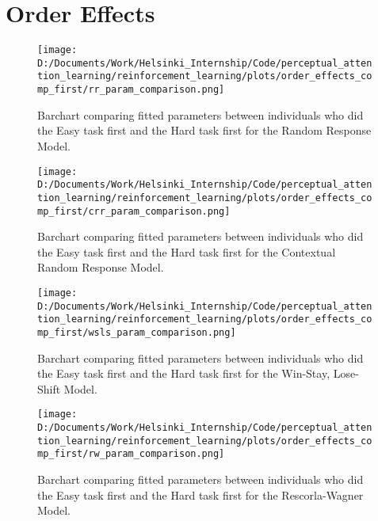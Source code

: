 \documentclass[12pt]{article}
\newcommand{\scale}{0.4}
\begin{document}
\section{Order Effects}

\begin{figure}[h]  %
	\centering
	\texttt{[image: D:/Documents/Work/Helsinki\_Internship/Code/perceptual\_attention\_learning/reinforcement\_learning/plots/order\_effects\_comp\_first/rr\_param\_comparison.png]}  %
	\caption{Barchart comparing fitted parameters between individuals who did the Easy task first and the Hard task first for the Random Response Model.}
	\label{fig:rr_model_effects}
\end{figure} 

\begin{figure}[h]  %
	\centering
	\texttt{[image: D:/Documents/Work/Helsinki\_Internship/Code/perceptual\_attention\_learning/reinforcement\_learning/plots/order\_effects\_comp\_first/crr\_param\_comparison.png]}  %
	\caption{Barchart comparing fitted parameters between individuals who did the Easy task first and the Hard task first for the Contextual Random Response Model.}
	\label{fig:crr_model_effects}
\end{figure} 

\begin{figure}[h]  %
	\centering
	\texttt{[image: D:/Documents/Work/Helsinki\_Internship/Code/perceptual\_attention\_learning/reinforcement\_learning/plots/order\_effects\_comp\_first/wsls\_param\_comparison.png]}  %
	\caption{Barchart comparing fitted parameters between individuals who did the Easy task first and the Hard task first for the Win-Stay, Lose-Shift Model.}
	\label{fig:wsls_model_effects}
\end{figure} 

\begin{figure}[h]  %
	\centering
	\texttt{[image: D:/Documents/Work/Helsinki\_Internship/Code/perceptual\_attention\_learning/reinforcement\_learning/plots/order\_effects\_comp\_first/rw\_param\_comparison.png]}  %
	\caption{Barchart comparing fitted parameters between individuals who did the Easy task first and the Hard task first for the Rescorla-Wagner Model.}
	\label{fig:rw_model_effects}
\end{figure} 
\end{document}
